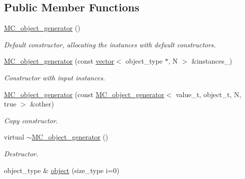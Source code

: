 \subsection*{Public Member Functions}
\begin{DoxyCompactItemize}
\item 
\hypertarget{a00368_a081520a40501e311f5000aa4694964a6}{\hyperlink{a00368_a081520a40501e311f5000aa4694964a6}{M\-C\-\_\-object\-\_\-generator} ()}\label{a00368_a081520a40501e311f5000aa4694964a6}

\begin{DoxyCompactList}\small\item\em Default constructor, allocating the instances with default constructors. \end{DoxyCompactList}\item 
\hypertarget{a00368_ad7a9b348190653afc8ff26feb093814b}{\hyperlink{a00368_ad7a9b348190653afc8ff26feb093814b}{M\-C\-\_\-object\-\_\-generator} (const \hyperlink{a00559}{vector}$<$ object\-\_\-type $\ast$, N $>$ \&instances\-\_\-)}\label{a00368_ad7a9b348190653afc8ff26feb093814b}

\begin{DoxyCompactList}\small\item\em Constructor with input instances. \end{DoxyCompactList}\item 
\hypertarget{a00368_a8dd90ab9da723ea5ed7691f4982a0e8e}{\hyperlink{a00368_a8dd90ab9da723ea5ed7691f4982a0e8e}{M\-C\-\_\-object\-\_\-generator} (const \hyperlink{a00364}{M\-C\-\_\-object\-\_\-generator}$<$ value\-\_\-t, object\-\_\-t, N, true $>$ \&other)}\label{a00368_a8dd90ab9da723ea5ed7691f4982a0e8e}

\begin{DoxyCompactList}\small\item\em Copy constructor. \end{DoxyCompactList}\item 
\hypertarget{a00368_a1a2a9d04b68f761d4f85b0eb9b3bac74}{virtual \hyperlink{a00368_a1a2a9d04b68f761d4f85b0eb9b3bac74}{$\sim$\-M\-C\-\_\-object\-\_\-generator} ()}\label{a00368_a1a2a9d04b68f761d4f85b0eb9b3bac74}

\begin{DoxyCompactList}\small\item\em Destructor. \end{DoxyCompactList}\item 
\hypertarget{a00368_a3acc77d34ae0bf4c381b417a3e80d5d9}{object\-\_\-type \& \hyperlink{a00368_a3acc77d34ae0bf4c381b417a3e80d5d9}{object} (size\-\_\-type i=0)}\label{a00368_a3acc77d34ae0bf4c381b417a3e80d5d9}


\end{DoxyCompactItemize}
